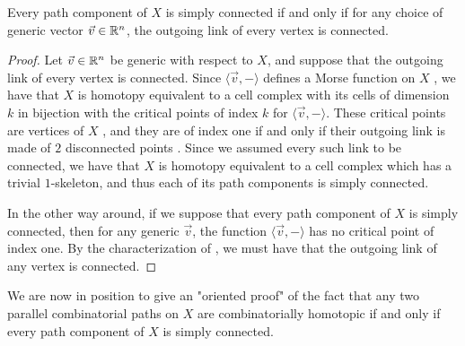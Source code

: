 \begin{proposition}
    \label{prop:outgoing-link}
    Every path component of $X$ is simply connected if and only if for any choice of generic vector $\vec v \in \mathbb R^n$, the outgoing link of every vertex is connected. 
\end{proposition}

\begin{proof}
    Let $\vec v \in \mathbb R^n$ be generic with respect to $X$, and suppose that the outgoing link of every vertex is connected. 
    Since $\langle \vec v , -\rangle$ defines a Morse function on $X$ \cite[Definition 2.2]{bestvinaMorseTheoryFiniteness1997}, we have that $X$ is homotopy equivalent to a cell complex with its cells of dimension $k$ in bijection with the critical points of index $k$ for $\langle \vec v , -\rangle$.
    These critical points are vertices of $X$ \cite[Lemma 2.3]{bestvinaMorseTheoryFiniteness1997}, and they are of index one if and only if their outgoing link is made of $2$ disconnected points \cite[Lemma 4.5]{grunertPLMorseTheory2019}.
    Since we assumed every such link to be connected, we have that $X$ is homotopy equivalent to a cell complex which has a trivial $1$-skeleton, and thus each of its path components is simply connected. 

    In the other way around, if we suppose that every path component of $X$ is simply connected, then for any generic $\vec v$, the function $\langle \vec v , -\rangle$ has no critical point of index one. 
    By the characterization of \cite[Lemma 4.5]{grunertPLMorseTheory2019}, we must have that the outgoing link of any vertex is connected. 
\end{proof}


We are now in position to give an "oriented proof" of the fact that any two parallel combinatorial paths on $X$ are combinatorially homotopic if and only if every path component of $X$ is simply connected.


